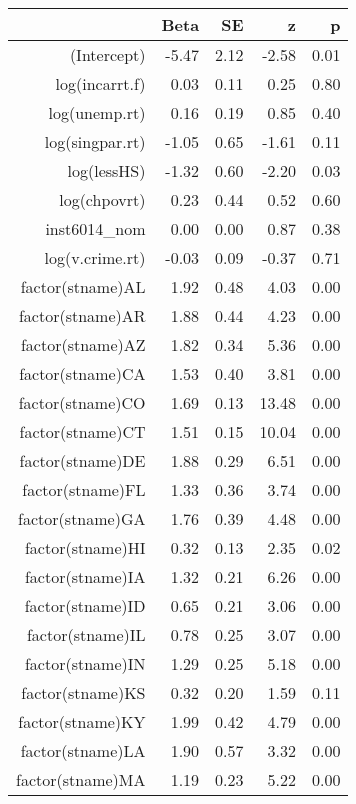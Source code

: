 \begin{table}[ht]
\centering
\begin{tabular}{rrrrr}
  \hline
 & Beta & SE & z & p \\ 
  \hline
(Intercept) & -5.47 & 2.12 & -2.58 & 0.01 \\ 
  log(incarrt.f) & 0.03 & 0.11 & 0.25 & 0.80 \\ 
  log(unemp.rt) & 0.16 & 0.19 & 0.85 & 0.40 \\ 
  log(singpar.rt) & -1.05 & 0.65 & -1.61 & 0.11 \\ 
  log(lessHS) & -1.32 & 0.60 & -2.20 & 0.03 \\ 
  log(chpovrt) & 0.23 & 0.44 & 0.52 & 0.60 \\ 
  inst6014\_nom & 0.00 & 0.00 & 0.87 & 0.38 \\ 
  log(v.crime.rt) & -0.03 & 0.09 & -0.37 & 0.71 \\ 
  factor(stname)AL & 1.92 & 0.48 & 4.03 & 0.00 \\ 
  factor(stname)AR & 1.88 & 0.44 & 4.23 & 0.00 \\ 
  factor(stname)AZ & 1.82 & 0.34 & 5.36 & 0.00 \\ 
  factor(stname)CA & 1.53 & 0.40 & 3.81 & 0.00 \\ 
  factor(stname)CO & 1.69 & 0.13 & 13.48 & 0.00 \\ 
  factor(stname)CT & 1.51 & 0.15 & 10.04 & 0.00 \\ 
  factor(stname)DE & 1.88 & 0.29 & 6.51 & 0.00 \\ 
  factor(stname)FL & 1.33 & 0.36 & 3.74 & 0.00 \\ 
  factor(stname)GA & 1.76 & 0.39 & 4.48 & 0.00 \\ 
  factor(stname)HI & 0.32 & 0.13 & 2.35 & 0.02 \\ 
  factor(stname)IA & 1.32 & 0.21 & 6.26 & 0.00 \\ 
  factor(stname)ID & 0.65 & 0.21 & 3.06 & 0.00 \\ 
  factor(stname)IL & 0.78 & 0.25 & 3.07 & 0.00 \\ 
  factor(stname)IN & 1.29 & 0.25 & 5.18 & 0.00 \\ 
  factor(stname)KS & 0.32 & 0.20 & 1.59 & 0.11 \\ 
  factor(stname)KY & 1.99 & 0.42 & 4.79 & 0.00 \\ 
  factor(stname)LA & 1.90 & 0.57 & 3.32 & 0.00 \\ 
  factor(stname)MA & 1.19 & 0.23 & 5.22 & 0.00 \\ 

\end{tabular}
\end{table}
